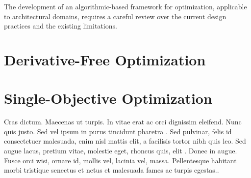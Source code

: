 \cleardoublepage
\label{chap:back}

The development of an algorithmic-based framework for optimization, applicable to architectural domains, requires a careful review over the current design practices and the existing limitations.

\section{Derivative-Free Optimization}


\section{Single-Objective Optimization}
Cras dictum. Maecenas ut turpis. In vitae erat ac orci dignissim eleifend. Nunc quis justo. Sed vel ipsum in purus tincidunt pharetra \cite{MacAulay:2005fk}. Sed pulvinar, felis id consectetuer malesuada, enim nisl mattis elit, a facilisis tortor nibh quis leo. Sed augue lacus, pretium vitae, molestie eget, rhoncus quis, elit \cite{Schwarz:2007lr}. Donec in augue. Fusce orci wisi, ornare id, mollis vel, lacinia vel, massa. Pellentesque habitant morbi tristique senectus et netus et malesuada fames ac turpis egestas..


